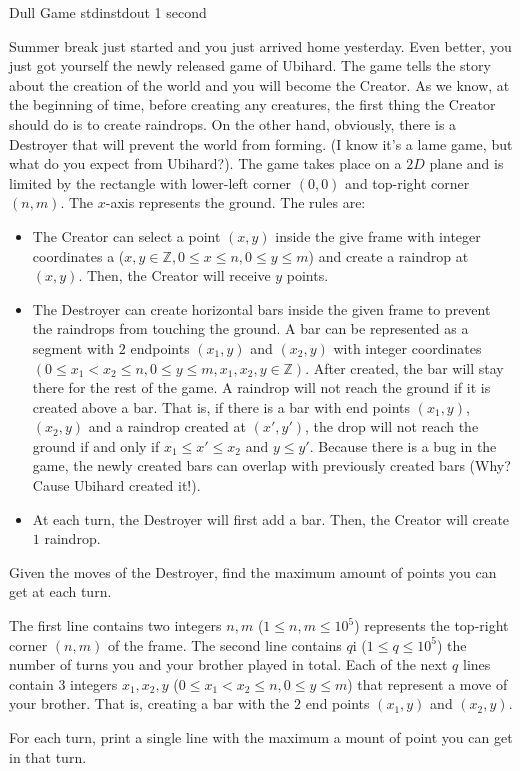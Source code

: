 \begin{problem}{Dull Game}
{stdin}{stdout}
{1 second}{}{}

Summer break just started and you just arrived home yesterday. Even better, you just got yourself the newly released game of Ubihard. The game tells the story about the creation of the world and you will become the Creator. As we know, at the beginning of time, before creating any creatures, the first thing the Creator should do is to create raindrops. On the other hand, obviously, there is a Destroyer that will prevent the world from forming. (I know it's a lame game, but what do you expect from Ubihard?). The game takes place on a $2D$ plane and is limited by the rectangle with lower-left corner $(0, 0)$ and top-right corner $(n, m)$. The $x$-axis represents the ground. The rules are:
	\begin{itemize}
		\item
		The Creator can select a point $(x, y)$ inside the give frame with integer coordinates a ($x, y \in \mathbb{Z}, 0 \leq x \leq n, 0 \leq y \leq m$) and create a raindrop at $(x, y)$. Then, the Creator will receive $y$ points.
		\item
		The Destroyer can create horizontal bars inside the given frame to prevent the raindrops from touching the ground. A bar can be represented as a segment with $2$ endpoints $(x_1, y)$ and $(x_2, y)$ with integer coordinates $(0 \leq x_1 < x_2 \leq n, 0 \leq y \leq m, x_1, x_2, y \in \mathbb{Z})$. After created, the bar will stay there for the rest of the game. A raindrop will not reach the ground if it is created above a bar. That is, if there is a bar with end points $(x_1, y)$, $(x_2, y)$ and a raindrop created at $(x', y')$, the drop will not reach the ground if and only if $x_1 \leq x' \leq x_2$ and $y \leq y'$. Because there is a bug in the game, the newly created bars can overlap with previously created bars (Why? Cause Ubihard created it!).
		\item
		At each turn, the Destroyer will first add a bar. Then, the Creator will create $1$ raindrop.
	\end{itemize}

\noindent Given the moves of the Destroyer, find the maximum amount of points you can get at each turn.

\InputFile

The first line contains two integers $n, m$ ($1 \leq n, m \leq 10^5$) represents the top-right corner $(n, m)$ of the frame. The second line contains $q$i ($1 \leq q \leq 10^5$) the number of turns you and your brother played in total. Each of the next $q$ lines contain $3$ integers $x_1, x_2, y$ ($0 \leq x_1 < x_2 \leq n, 0 \leq y \leq m$) that represent a move of your brother. That is, creating a bar with the $2$ end points $(x_1, y)$ and $(x_2, y)$.

\OutputFile

For each turn, print a single line with the maximum a mount of point you can get in that turn.

\Examples

\begin{example}
%
\end{example}

\end{problem}
